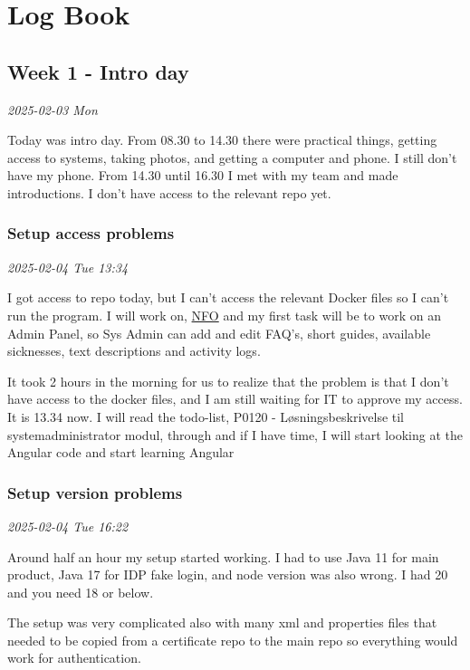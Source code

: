 \documentclass[../main.tex]{subfiles}
\begin{document}
\section{Log Book}
\subsection{Week 1 - Intro day}

\noindent \textit{2025-02-03 Mon}

Today was intro day. From 08.30 to 14.30 there were practical things, getting access to systems, taking photos, and getting a computer and phone. I still don't have my phone. From 14.30 until 16.30 I met with my team and made introductions. I don't have access to the relevant repo yet.

\subsubsection{Setup access problems}

\noindent \textit{2025-02-04 Tue 13:34}

I got access to repo today, but I can't access the relevant Docker files so I can't run the program. I will work on, \href{https://nationaltforsoegsoverblik.dk/}{NFO} and my first task will be to work on an Admin Panel, so Sys Admin can add and edit FAQ's, short guides, available sicknesses, text descriptions and activity logs.

It took 2 hours in the morning for us to realize that the problem is that I don't have access to the docker files, and I am still waiting for IT to approve my access. It is 13.34 now. I will read the todo-list, P0120 - Løsningsbeskrivelse til systemadministrator modul, through and if I have time, I will start looking at the Angular code and start learning Angular

\subsubsection{Setup version problems}

\noindent \textit{2025-02-04 Tue 16:22}

Around half an hour my setup started working. I had to use Java 11 for main product, Java 17 for IDP fake login, and node version was also wrong. I had 20 and you need 18 or below.

The setup was very complicated also with many xml and properties files that needed to be copied from a certificate repo to the main repo so everything would work for authentication.
\end{document}
